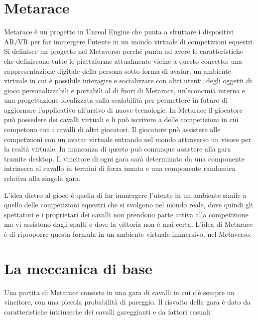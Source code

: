 
\section{Metarace}

    Metarace è un progetto in Unreal Engine che punta a sfruttare i dispositivi AR/VR per far immergere l'utente in un mondo virtuale di competizioni equestri.
    Si definisce un progetto nel Metaverso perché punta ad avere le caratteristiche che definiscono tutte le piattaforme attualmente vicine a questo concetto: una rappresentazione digitale della persona sotto forma di avatar, un ambiente virtuale in cui è possibile interagire e socializzare con altri utenti, degli oggetti di gioco personalizzabili e portabili al di fuori di Metarace, un'economia interna e una progettazione focalizzata sulla scalabilità per permettere in futuro di aggiornare l'applicativo all'arrivo di nuove tecnologie.
    In Metarace il giocatore può possedere dei cavalli virtuali e li può iscrivere a delle competizioni in cui competono con i cavalli di altri giocatori.
    Il giocatore può assistere alle competizioni con un avatar virtuale entrando nel mondo attraverso un visore per la realtà virtuale. 
    In mancanza di questo può comunque assistere alla gara tramite desktop. 
    Il vincitore di ogni gara sarà determinato da una componente intrinseca al cavallo in termini di forza innata e una componente randomica relativa alla singola gara.

    L'idea dietro al gioco è quella di far immergere l'utente in un ambiente simile a quello delle competizioni equestri che si svolgono nel mondo reale, dove quindi gli spettatori e i proprietari dei cavalli non prendono parte attiva alla competizione ma vi assistono dagli spalti e dove la vittoria non è mai certa. 
    L'idea di Metarace è di riproporre questa formula in un ambiente virtuale immersivo, nel Metaverso.

\section{La meccanica di base} \label{sec:Meccanica}

    Una partita di Metarace consiste in una gara di cavalli in cui c'è sempre un vincitore, con una piccola probabilità di pareggio.
    Il risvolto della gara è dato da caratteristiche intrinseche dei cavalli gareggianti e da fattori casuali.

